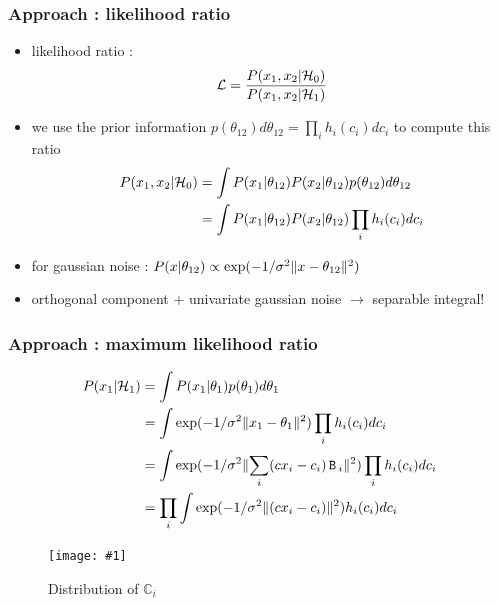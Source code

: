 \documentclass[compress]{beamer} %
\newcommand{\mat}[1]{\ensuremath{\,\mathtt{#1}\,}}
\newcommand{\rand}[1]{\ensuremath{\mathbb{#1}}}
\newcommand{\insertF}[3]{
  \begin{figure}[h!]
    \centering
    \begin{minipage}{#3\linewidth}
    \texttt{[image: \#1]}
    \end{minipage}  
      \caption{#2}
  \end{figure}  
}
\begin{document}
 \begin{frame}
  \frametitle{Approach : likelihood ratio}
  \begin{itemize}
   \item likelihood ratio :
   \begin{equation}
    \mathcal{L}=\frac{P(x_1,x_2 \arrowvert \mathcal{H}_0)}{P(x_1,x_2 \arrowvert \mathcal{H}_1)}
   \end{equation}
   \item we use the prior information $p(\theta_{12}) d\theta_{12}=\prod_i h_i(c_i)dc_i$ to compute this ratio
   \begin{equation}
   \begin{split}
       P(x_1,x_2 \arrowvert \mathcal{H}_0)&=\int P(x_1 \arrowvert \theta_{12}) P(x_2 \arrowvert \theta_{12}) p(\theta_{12}) d\theta_{12}\\
       &=\int P(x_1 \arrowvert \theta_{12}) P(x_2 \arrowvert \theta_{12}) \prod_i h_i(c_i)dc_i\\
   \end{split}
   \end{equation}
   \item for gaussian noise : $P(x \arrowvert \theta_{12})\propto \exp (- 1/\sigma^2  \lVert x-\theta_{12} \rVert^2) $
   \item orthogonal component $ +$ univariate gaussian noise $\longrightarrow$ separable integral! 
  \end{itemize}
 \end{frame}
 
 \begin{frame}
  \frametitle{Approach : maximum likelihood ratio}

   \begin{equation}
   \begin{split}
       P(x_1 \arrowvert \mathcal{H}_1)&=\int P(x_1 \arrowvert \theta_{1})  p(\theta_{1}) d\theta_{1}\\
       &=\int \exp (- 1/\sigma^2  \lVert x_1-\theta_{1} \rVert^2)  \prod_i h_i(c_i)dc_i\\
       &=\int \exp (- 1/\sigma^2  \lVert \sum _i (cx_i -c_{i})\mat B_i \rVert^2)  \prod_i h_i(c_i)dc_i\\
       &=\prod_i \int \exp (- 1/\sigma^2  \lVert (cx_i -c_{i}) \rVert^2)   h_i(c_i)dc_i\\
   \end{split}
   \end{equation}
   \insertF{corr}{Distribution of $\rand{C}_i$}{0.3}
 \end{frame}
 
\end{document}
